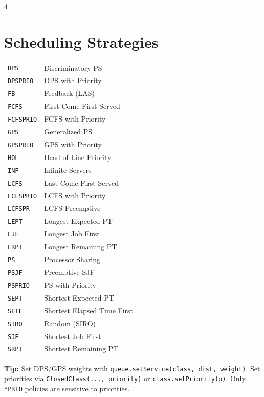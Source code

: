 \documentclass[9pt,landscape,a4paper]{extarticle}
\begin{document}
\begin{multicols}{4}
\section*{Scheduling Strategies}
\begin{tabular}{@{}ll@{}}
\texttt{DPS} & Discriminatory PS \\
\texttt{DPSPRIO} & DPS with Priority \\
\texttt{FB} & Feedback (LAS) \\
\texttt{FCFS} & First-Come First-Served \\
\texttt{FCFSPRIO} & FCFS with Priority \\
\texttt{GPS} & Generalized PS \\
\texttt{GPSPRIO} & GPS with Priority \\
\texttt{HOL} & Head-of-Line Priority \\
\texttt{INF} & Infinite Servers \\
\texttt{LCFS} & Last-Come First-Served \\
\texttt{LCFSPRIO} & LCFS with Priority \\
\texttt{LCFSPR} & LCFS Preemptive \\
\texttt{LEPT} & Longest Expected PT \\
\texttt{LJF} & Longest Job First \\
\texttt{LRPT} & Longest Remaining PT \\
\texttt{PS} & Processor Sharing \\
\texttt{PSJF} & Preemptive SJF \\
\texttt{PSPRIO} & PS with Priority \\
\texttt{SEPT} & Shortest Expected PT \\
\texttt{SETF} & Shortest Elapsed Time First \\
\texttt{SIRO} & Random (SIRO) \\
\texttt{SJF} & Shortest Job First \\
\texttt{SRPT} & Shortest Remaining PT \\
\end{tabular}

\begin{tipbox}
\textbf{Tip:} Set DPS/GPS weights with \texttt{queue.setService(class, dist, weight)}. Set priorities via \texttt{ClosedClass(..., priority)} or \texttt{class.setPriority(p)}. Only \texttt{*PRIO} policies are sensitive to priorities.
\end{tipbox}


\end{multicols}
\end{document}
